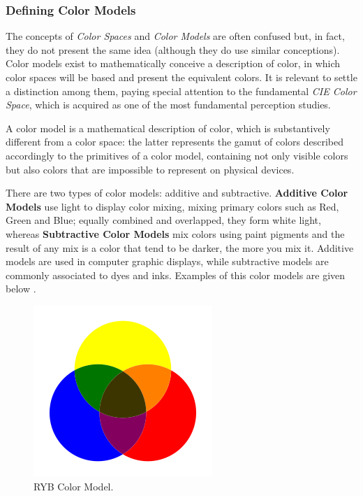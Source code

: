 \subsubsection{Defining Color Models}		%
%
The concepts of \emph{Color Spaces} and \emph{Color Models} are often confused but, in fact, they do not present the same idea
(although they do use similar conceptions). Color models exist to mathematically conceive a description of color,
in which color spaces will be based and present the equivalent colors. It is relevant to settle a distinction among
them, paying special attention to the fundamental \emph{CIE Color Space}, which is acquired as one of the most
fundamental perception studies. \par
%
A color model is a mathematical description of color, which is substantively different from a color space: the latter represents
the gamut of colors described accordingly to the primitives of a color model, containing not only visible colors
but also colors that are impossible to represent on physical devices. \par
There are two types of color models: additive and subtractive. \textbf{Additive Color Models} use light
to display color mixing, mixing primary colors such as Red, Green and Blue; equally combined and
overlapped, they form white light, whereas \textbf{Subtractive Color Models} mix colors using paint pigments
and the result of any mix is a color that tend to be darker, the more you mix it. Additive models are used
in computer graphic displays, while subtractive models are commonly associated to dyes and inks. Examples
of this color models are given below \cite{Ware2012}. \par
%
\begin{figure}
  \centering
  \vspace{-2\baselineskip}
  \includegraphics[width=\linewidth]{images/background/RYB.png}
  \caption[RYB Color Model Schematic]{RYB Color Model.\protect\footnotemark{}}
  \label{fig:RYB}
\end{figure}
%
